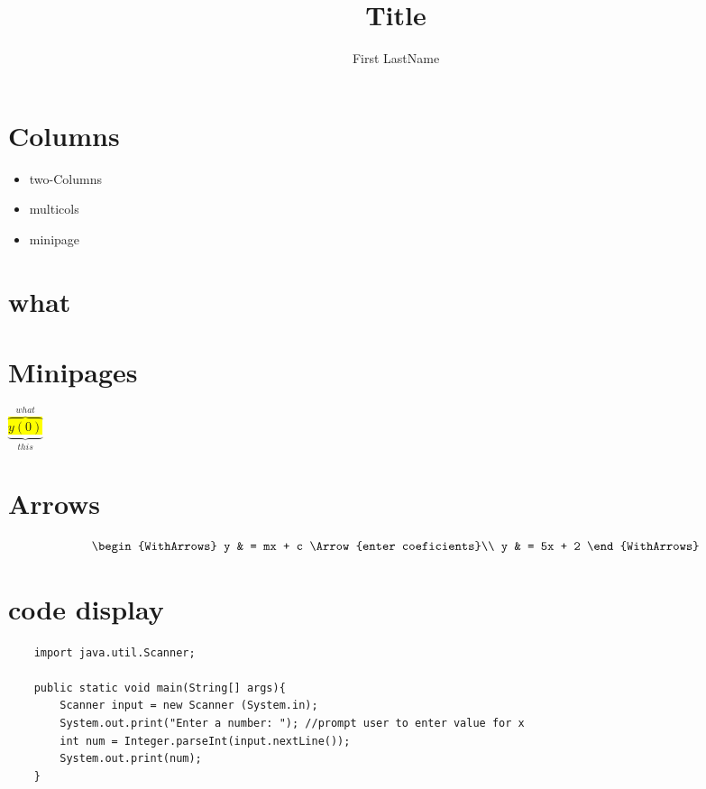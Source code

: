 \documentclass{report}
\title{Title}
\author{First LastName}
\begin{document}
\parindent 0pt
\parskip 12pt
\maketitle

\onecolumn
\begin{multicols}{2}

    \section{Columns}
    \begin{itemize}
        \item two-Columns
        \item multicols
        \item minipage
    \end{itemize}
    \lipsum[1-4]

    \section{what}
\end{multicols}

\onecolumn
\section{Minipages}

\begin{minipage}{0.5\textwidth}
    \lipsum[1]
\end{minipage}
\hspace{10pt}
\begin{minipage}{0.4\textwidth}
    \lipsum[1]
\end{minipage}
\newpage
\colorbox{yellow}{$ \overbrace{\underbrace{y(0)}_{this}}^{what}$}

\section{Arrows}
\[\begin{WithArrows}
        y & = mx  + c  \Arrow{enter coeficients}\\
        y & = 5x + 2
    \end{WithArrows}
\]
\section{code display}
\begin{verbatim}
    import java.util.Scanner;

    public static void main(String[] args){
        Scanner input = new Scanner (System.in);
        System.out.print("Enter a number: "); //prompt user to enter value for x
        int num = Integer.parseInt(input.nextLine());
        System.out.print(num);
    }
\end{verbatim}
\end{document}
